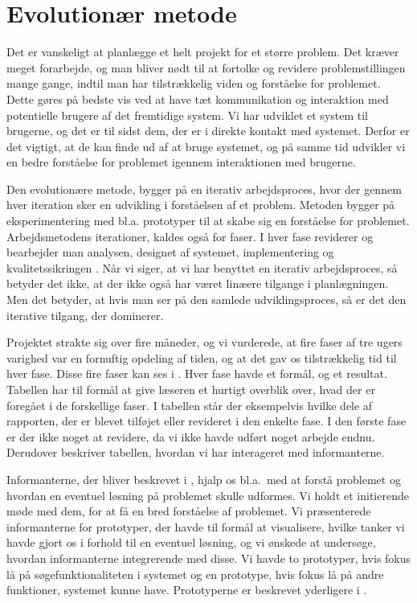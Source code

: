 \section{Evolutionær metode}
\label{sec:evolution}

Det er vanskeligt at planlægge et helt projekt for et større problem. Det kræver meget forarbejde, og man bliver nødt til at fortolke og revidere problemstillingen mange gange, indtil man har tilstrækkelig viden og forståelse for problemet. Dette gøres på bedste vis ved at have tæt kommunikation og interaktion med potentielle brugere af det fremtidige system. Vi har udviklet et system til brugerne, og det er til sidst dem, der er i direkte kontakt med systemet. Derfor er det vigtigt, at de kan finde ud af at bruge systemet, og på samme tid udvikler vi en bedre forståelse for problemet igennem interaktionen med brugerne. 

Den evolutionære metode, bygger på en iterativ arbejdsproces, hvor der gennem hver iteration sker en udvikling i forståelsen af et problem. Metoden bygger på eksperimentering med bl.a. prototyper til at skabe sig en forståelse for problemet. Arbejdsmetodens iterationer, kaldes også for faser. I hver fase reviderer og bearbejder man analysen, designet af systemet, implementering og kvalitetssikringen \cite{cic}. Når vi siger, at vi har benyttet en iterativ arbejdsproces, så betyder det ikke, at der ikke også har været linæere tilgange i planlægningen. Men det betyder, at hvis man ser på den samlede udviklingsproces, så er det den iterative tilgang, der dominerer.

Projektet strakte sig over fire måneder, og vi vurderede, at fire faser af tre ugers varighed var en fornuftig opdeling af tiden, og at det gav os tilstrækkelig tid til hver fase. Disse fire faser kan ses i . Hver fase havde et formål, og et resultat. Tabellen har til formål at give læseren et hurtigt overblik over, hvad der er foregået i de forskellige faser. I tabellen står der eksempelvis hvilke dele af rapporten, der er blevet tilføjet eller revideret i den enkelte fase. I den første fase er der ikke noget at revidere, da vi ikke havde udført noget arbejde endnu. Derudover beskriver tabellen, hvordan vi har interageret med informanterne.

Informanterne, der bliver beskrevet i , hjalp os bl.a.\ med at forstå problemet og hvordan en eventuel løsning på problemet skulle udformes. Vi holdt et initierende møde med dem, for at få en bred forståelse af problemet. Vi præsenterede informanterne for prototyper, der havde til formål at visualisere, hvilke tanker vi havde gjort os i forhold til en eventuel løsning, og vi ønskede at undersøge, hvordan informanterne integrerende med disse. Vi havde to prototyper, hvis fokus lå på søgefunktionaliteten i systemet og en prototype, hvis fokus lå på andre funktioner, systemet kunne have. Prototyperne er beskrevet yderligere i . 


